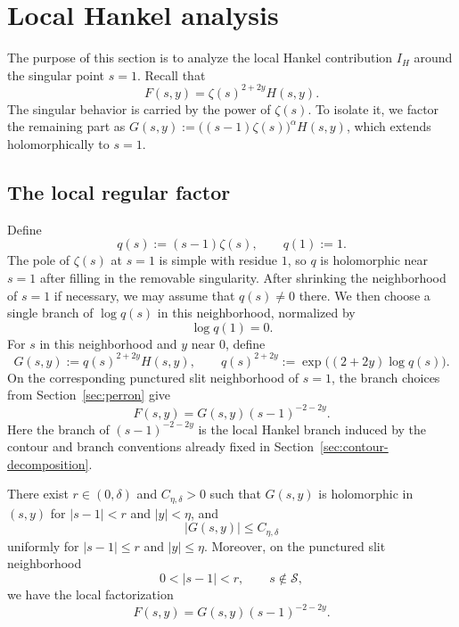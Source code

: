 \section{Local Hankel analysis}\label{sec:hankel}

The purpose of this section is to analyze the local Hankel
contribution $I_H$ around the singular point $s=1$. Recall that
\[
    F(s,y)=\zeta(s)^{2+2y}H(s,y).
\]
The singular behavior is carried by the power of $\zeta(s)$. To isolate it, we factor the remaining part as $G(s,y):=\big((s-1)\zeta(s)\big)^{\alpha}H(s,y)$, which extends holomorphically to $s=1$.

\subsection{The local regular factor}\label{sec:local-regular-factor}

Define
\begin{equation}\label{eq:q-local-def}
    q(s):=(s-1)\zeta(s),\qquad q(1):=1.
\end{equation}
The pole of $\zeta(s)$ at $s=1$ is simple with residue $1$, so
$q$ is holomorphic near $s=1$ after filling in the removable
singularity. After shrinking the neighborhood of $s=1$ if necessary,
we may assume that $q(s)\neq0$ there. We then choose a single
branch of $\log q(s)$ in this neighborhood, normalized by
\[
    \log q(1)=0.
\]
For $s$ in this neighborhood and $y$ near $0$, define
\begin{equation}\label{eq:G-def}
    G(s,y):=q(s)^{2+2y}H(s,y),
    \qquad
    q(s)^{2+2y}:=\exp\bigl((2+2y)\log q(s)\bigr).
\end{equation}
On the corresponding punctured slit neighborhood of $s=1$, the
branch choices from Section~\ref{sec:perron} give
\begin{equation}\label{eq:F-local-factorization}
    F(s,y)=G(s,y)(s-1)^{-2-2y}.
\end{equation}
Here the branch of $(s-1)^{-2-2y}$ is the local Hankel branch
induced by the contour and branch conventions already fixed in
Section~\ref{sec:contour-decomposition}.

\begin{lemma}
\label{lem:G-local-analytic}
There exist $r\in(0,\delta)$ and $C_{\eta,\delta}>0$ such that $G(s,y)$ is
holomorphic in $(s,y)$ for $|s-1|<r$ and $|y|<\eta$, and
\[
    |G(s,y)|\leq C_{\eta,\delta}
\]
uniformly for $|s-1|\leq r$ and $|y|\leq\eta$. Moreover, on the
punctured slit neighborhood
\[
    0<|s-1|<r,\qquad s\notin\mathcal S,
\]
we have the local factorization
\[
    F(s,y)=G(s,y)(s-1)^{-2-2y}.
\]
\end{lemma}

